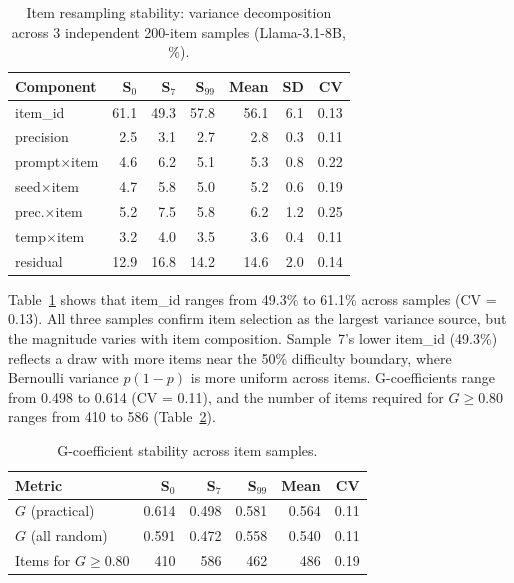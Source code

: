 \documentclass[11pt,letterpaper]{article}
\begin{document}
\begin{table}[t]
\centering
\caption{Item resampling stability: variance decomposition across 3 independent 200-item samples (Llama-3.1-8B, \%).}
\label{tab:resampling}
\small
\begin{tabular}{@{}lrrrrrr@{}}
\toprule
Component & S$_0$ & S$_7$ & S$_{99}$ & Mean & SD & CV \\
\midrule
item\_id & 61.1 & 49.3 & 57.8 & 56.1 & 6.1 & 0.13 \\
precision & 2.5 & 3.1 & 2.7 & 2.8 & 0.3 & 0.11 \\
prompt$\times$item & 4.6 & 6.2 & 5.1 & 5.3 & 0.8 & 0.22 \\
seed$\times$item & 4.7 & 5.8 & 5.0 & 5.2 & 0.6 & 0.19 \\
prec.$\times$item & 5.2 & 7.5 & 5.8 & 6.2 & 1.2 & 0.25 \\
temp$\times$item & 3.2 & 4.0 & 3.5 & 3.6 & 0.4 & 0.11 \\
residual & 12.9 & 16.8 & 14.2 & 14.6 & 2.0 & 0.14 \\
\bottomrule
\end{tabular}
\end{table}

Table~\ref{tab:resampling} shows that item\_id ranges from 49.3\% to 61.1\% across samples (CV = 0.13).
All three samples confirm item selection as the largest variance source, but the magnitude varies with item composition.
Sample~7's lower item\_id (49.3\%) reflects a draw with more items near the 50\% difficulty boundary, where Bernoulli variance $p(1-p)$ is more uniform across items.
G-coefficients range from 0.498 to 0.614 (CV = 0.11), and the number of items required for $G \geq 0.80$ ranges from 410 to 586 (Table~\ref{tab:g_stability}).

\begin{table}[t]
\centering
\caption{G-coefficient stability across item samples.}
\label{tab:g_stability}
\small
\begin{tabular}{@{}lrrrrr@{}}
\toprule
Metric & S$_0$ & S$_7$ & S$_{99}$ & Mean & CV \\
\midrule
$G$ (practical) & 0.614 & 0.498 & 0.581 & 0.564 & 0.11 \\
$G$ (all random) & 0.591 & 0.472 & 0.558 & 0.540 & 0.11 \\
Items for $G$$\geq$0.80 & 410 & 586 & 462 & 486 & 0.19 \\
\bottomrule
\end{tabular}
\end{table}
\end{document}
